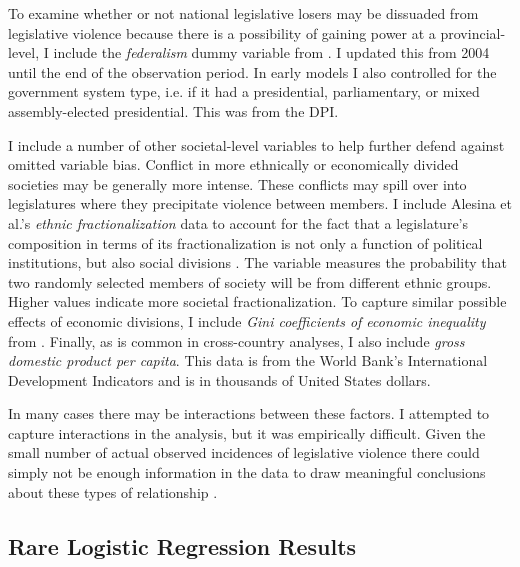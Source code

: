 \documentclass[a4paper]{article}\usepackage{graphicx, color}
\begin{document}
To examine whether or not national legislative losers may be dissuaded from legislative violence because there is a possibility of gaining power at a provincial-level, I include the \emph{federalism} dummy variable from \cite{Carey2011}. I updated this from 2004 until the end of the observation period. In early models I also controlled for the government system type, i.e. if it had a presidential, parliamentary, or mixed assembly-elected presidential. This was from the DPI.

I include a number of other societal-level variables to help further defend against omitted variable bias. Conflict in more ethnically or economically divided societies may be generally more intense. These conflicts may spill over into legislatures where they precipitate violence between members. I include Alesina et al.'s \citeyearpar{Alesina2003} {\emph{ethnic fractionalization}} data to account for the fact that a legislature's composition in terms of its fractionalization is not only a function of political institutions, but also social divisions \citep{Neto1997, Mozaffar2003}. The variable measures the probability that two randomly selected members of society will be from different ethnic groups. Higher values indicate more societal fractionalization. To capture similar possible effects of economic divisions, I include {\emph{Gini coefficients of economic inequality}} from \cite{UNU2008}. Finally, as is common in cross-country analyses, I also include {\emph{gross domestic product per capita}}. This data is from the World Bank's International Development Indicators \citeyearpar{WorldBank2011} and is in thousands of United States dollars.

In many cases there may be interactions between these factors. I attempted to capture interactions in the analysis, but it was empirically difficult. Given the small number of actual observed incidences of legislative violence there could simply not be enough information in the data to draw meaningful conclusions about these types of relationship \citep[see][]{Brambor2006}.



\subsection{Rare Logistic Regression Results}
\end{document}
